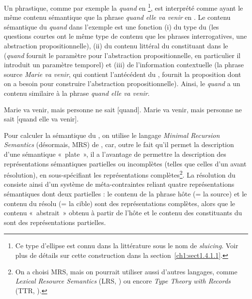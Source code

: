  \largerpage 
Un  phrastique, comme par exemple la  \textit{quand} en \footnote{Ce type d’ellipse est connu dans la littérature sous le nom de \textit{sluicing}. Voir plus de détails sur cette construction dans la section~\ref{ch1:sect1.4.1.1}.}, est interprété comme ayant le même contenu sémantique que la phrase \textit{quand elle va venir} en . Le contenu sémantique du  \textit{quand} dans l’exemple  est une fonction (i) du type du  (les questions courtes ont le même type de contenu que les phrases interrogatives, {\cad} une abstraction propositionnelle), (ii) du contenu littéral du constituant dans le  (\textit{quand} fournit le paramètre pour l’abstraction propositionnelle, en particulier il introduit un paramètre temporel) et (iii) de l’information contextuelle (la phrase source \textit{Marie va venir}, qui contient l’antécédent du , fournit la proposition dont on a besoin pour construire l’abstraction propositionnelle). Ainsi, le  \textit{quand} a un contenu similaire à la phrase \textit{quand elle va venir}.  

\ea \label{ch3:ex112}
\ea 
Marie va venir, mais personne ne sait [quand]. \label{ch3:ex112a} 
\ex
Marie va venir, mais personne ne sait [quand elle va venir]. \label{ch3:ex112b}
\z 
\z

Pour calculer la sémantique du , on utilise le langage \textit{Minimal Recursion Semantics} (désormais, MRS) de \citet{CopestakeEtAl2005}, car, outre le fait qu’il permet la description d’une sémantique «~plate~», il a l’avantage de permettre la description des représentations sémantiques partielles ou incomplètes (telles que celles d’un  avant résolution), en sous-spécifiant les représentations complètes\footnote{ On a choisi MRS, mais on pourrait utiliser aussi d’autres langages, comme \textit{Lexical Resource Semantics} (LRS, \citealt{RichterEtAl2004}) ou encore \textit{Type Theory with Records} (TTR, \citealt{Cooper2005}).}. La résolution du  consiste ainsi d'un système de méta-contraintes reliant quatre représentations sémantiques dont deux partielles : le contenu de la phrase hôte (= la source) et le contenu du  résolu (= la cible) sont des représentations complètes, alors que le contenu «~abstrait~» obtenu à partir de l’hôte et le contenu des constituants du  sont des représentations partielles.

